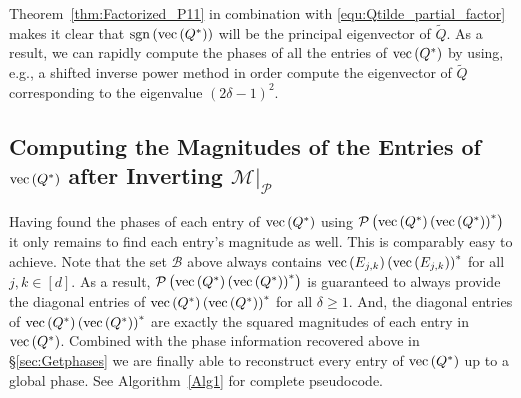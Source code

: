 \documentclass[]{spie}  %
\def \sgn {{\rm sgn}}
\begin{document}
Theorem~\ref{thm:Factorized_P11} in combination with \eqref{equ:Qtilde_partial_factor} makes it clear that $\sgn \left( {\rm vec} \left(Q^* \right) \right)$ will be the principal eigenvector of $\tilde{Q}$.  As a result, we can rapidly compute the phases of all the entries of ${\rm vec}\left(Q^* \right)$ by using, e.g., a shifted inverse power method\cite{trefethen1997numerical} in order compute the eigenvector of $\tilde{Q}$ corresponding to the eigenvalue $(2 \delta - 1)^2$. 

\subsection{Computing the Magnitudes of the Entries of ${\rm vec}\left(Q^* \right)$ after Inverting $\mathcal{M} \big|_{\mathcal{P}}$}
\label{sec:Getmags}

Having found the phases of each entry of ${\rm vec}\left(Q^* \right)$ using $\mathcal{P} \left( {\rm vec}\left(Q^* \right) \left( {\rm vec} \left(Q^* \right) \right)^* \right)$ it only remains to find each entry's magnitude as well.  This is comparably easy to achieve.  Note that the set $\mathcal{B}$ above always contains ${\rm vec} \left( E_{j,k} \right) \left({\rm vec} \left( E_{j,k} \right) \right)^*$ for all $j,k \in [d]$.  As a result, $\mathcal{P} \left( {\rm vec}\left(Q^* \right) \left( {\rm vec} \left(Q^* \right) \right)^* \right)$ is guaranteed to always provide the diagonal entries of ${\rm vec}\left(Q^* \right) \left( {\rm vec} \left(Q^* \right) \right)^*$ for all $\delta \geq 1$.  And, the diagonal entries of ${\rm vec}\left(Q^* \right) \left( {\rm vec} \left(Q^* \right) \right)^*$ are exactly the squared magnitudes of each entry in ${\rm vec}\left(Q^* \right)$.  
Combined with the phase information recovered above in \S\ref{sec:Getphases} we are finally able to reconstruct every entry of ${\rm vec}\left(Q^* \right)$ up to a global phase.  See Algorithm~\ref{Alg1} for complete pseudocode.
\end{document}
